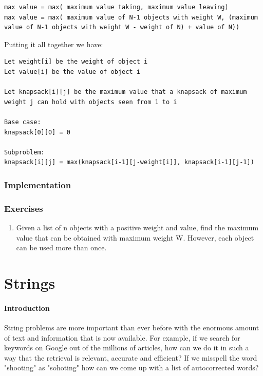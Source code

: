 \documentclass[11pt,oneside]{book}
\begin{document}
\begin{lstlisting}
max value = max( maximum value taking, maximum value leaving)
max value = max( maximum value of N-1 objects with weight W, (maximum value of N-1 objects with weight W - weight of N) + value of N))
\end{lstlisting}

Putting it all together we have:

\begin{lstlisting}
Let weight[i] be the weight of object i
Let value[i] be the value of object i

Let knapsack[i][j] be the maximum value that a knapsack of maximum weight j can hold with objects seen from 1 to i

Base case:
knapsack[0][0] = 0

Subproblem:
knapsack[i][j] = max(knapsack[i-1][j-weight[i]], knapsack[i-1][j-1])
\end{lstlisting}

\subsection{Implementation}

\subsection{Exercises}

\begin{enumerate}
\item Given a list of n objects with a positive weight and value, find the maximum value that can be obtained with maximum weight W. However, each object can be used more than once.
\end{enumerate}
\chapter{Strings}\subsubsection{Introduction}

String problems are more important than ever before with the enormous amount of text and information that is now available. For example, if we search for keywords on Google out of the millions of articles, how can we do it in such a way that the retrieval is relevant, accurate and efficient? If we misspell the word "shooting" as "sohoting" how can we come up with a list of autocorrected words?
\end{document}

